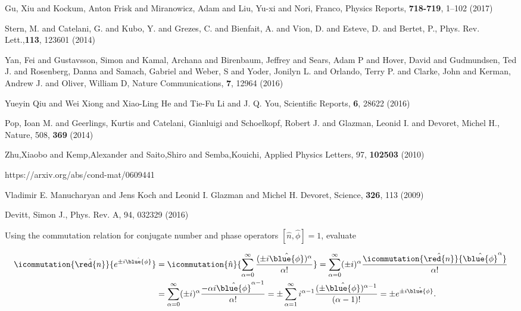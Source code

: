 \begin{thebibliography}{99}
Gu, Xiu and Kockum, Anton Frisk and Miranowicz, Adam and Liu, Yu-xi and Nori, Franco, Physics Reports, \textbf{718-719}, 1--102 (2017)

Stern, M. and Catelani, G. and Kubo, Y. and Grezes, C. and Bienfait, A. and Vion, D. and Esteve, D. and Bertet, P., Phys. Rev. Lett.,\textbf{113}, 123601 (2014)

Yan, Fei and Gustavsson, Simon and Kamal, Archana and Birenbaum, Jeffrey and Sears, Adam P and Hover, David and Gudmundsen, Ted J. and Rosenberg, Danna and Samach, Gabriel and Weber, S and Yoder, Jonilyn L. and Orlando, Terry P. and Clarke, John and Kerman, Andrew J. and Oliver, William D, Nature Communications, \textbf{7}, 12964 (2016)

Yueyin Qiu and Wei Xiong and Xiao-Ling He and Tie-Fu Li and J. Q. You, Scientific Reports, \textbf{6}, 28622 (2016)	

Pop, Ioan M. and Geerlings, Kurtis and Catelani, Gianluigi and Schoelkopf, Robert J. and Glazman, Leonid I. and Devoret, Michel H., Nature, 508, \textbf{369} (2014)


Zhu,Xiaobo and Kemp,Alexander and Saito,Shiro and Semba,Kouichi, Applied Physics Letters, 97, \textbf{102503} (2010)




https://arxiv.org/abs/cond-mat/0609441

{Vladimir E. Manucharyan and Jens Koch and Leonid I. Glazman and Michel H. Devoret}, {Science}, \textbf{326}, 113 (2009)

Devitt, Simon J., Phys. Rev. A, {94}, {032329} (2016)

 Using the commutation relation for conjugate number and phase operators $ \left[\hat{n},\hat{\phi}\right] = 1 $, evaluate
 
{\scriptsize\begin{equation}\label{eq:ab1}
 \begin{aligned}
 \icommutation{\hat{\red{n}}}{e^{\pm i \hat{\blue{\phi}}}} & =  \icommutation{\hat{n}}{\sum_{\alpha = 0}^{\infty} \frac{(\pm i\hat{\blue{\phi}})^\alpha}{\alpha!}} = \sum_{\alpha = 0}^{\infty} (\pm i)^\alpha\frac{\icommutation{\hat{\red{n}}}{\hat{\blue{\phi}}^\alpha}}{\alpha!}\\
 & = \sum_{\alpha = 0}^{\infty} (\pm i)^\alpha\frac{-\alpha i\hat{\blue{\phi}}^{\alpha - 1}}{\alpha!} = 
 \pm \sum_{\alpha = 1}^{\infty}i^{\alpha - 1}\frac{(\pm\hat{\blue{\phi}})^{\alpha - 1}}{(\alpha - 1)!} =
 \pm e^{\pm i\hat{\blue{\phi}}}.
 \end{aligned}
\end{equation}}
 

\end{thebibliography}
